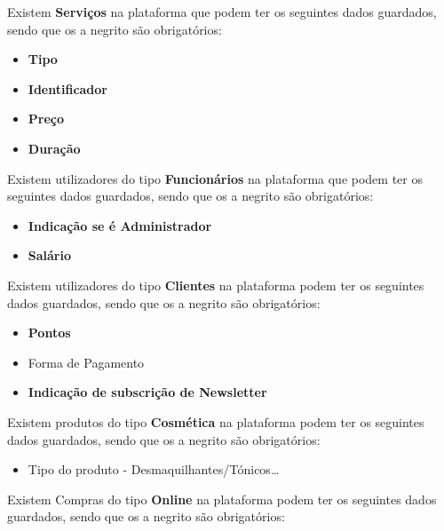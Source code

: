\documentclass[10pt,portuguese]{article}
\begin{document}
\par Existem \textbf{Serviços} na plataforma que podem ter os seguintes dados guardados, sendo que os a negrito são obrigatórios:

\begin{itemize}
    \item \textbf{Tipo}
    \item \textbf{Identificador}
    \item \textbf{Preço}
    \item \textbf{Duração}
\end{itemize}

\par Existem utilizadores do tipo \textbf{Funcionários} na plataforma que podem ter os seguintes dados guardados, sendo que os a negrito são obrigatórios:

\begin{itemize}
    \item \textbf{Indicação se é Administrador}
    \item \textbf{Salário}
\end{itemize}

\clearpage

\par Existem utilizadores do tipo \textbf{Clientes} na plataforma podem ter os seguintes dados guardados, sendo que os a negrito são obrigatórios:

\begin{itemize}
    \item \textbf{Pontos}
    \item Forma de Pagamento
    \item \textbf{Indicação de subscrição de Newsletter}
\end{itemize}

\par Existem produtos do tipo \textbf{Cosmética} na plataforma podem ter os seguintes dados guardados, sendo que os a negrito são obrigatórios:


\begin{itemize}
    \item Tipo do produto - Desmaquilhantes/Tónicos…
\end{itemize}


\par Existem Compras do tipo \textbf{Online} na plataforma podem ter os seguintes dados guardados, sendo que os a negrito são obrigatórios:
\end{document}
